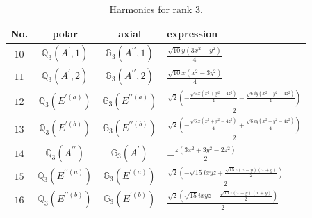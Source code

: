 \documentclass[fleqn,8pt,landscape]{jsarticle}
\begin{document}
\begin{table}[ht!]
\begin{center}
\caption{Harmonics for rank 3.}
\renewcommand{\arraystretch}{1.3}
\begin{tabular}{cccl} \hline \hline
No. & polar & axial & expression \\ \hline
$ 10 $ & $ \mathbb{Q}_{3}(A^{\prime},1) $ & $ \mathbb{G}_{3}(A^{\prime\prime},1) $ & $ \frac{\sqrt{10} y \left(3 x^{2} - y^{2}\right)}{4} $ \\
$ 11 $ & $ \mathbb{Q}_{3}(A^{\prime},2) $ & $ \mathbb{G}_{3}(A^{\prime\prime},2) $ & $ \frac{\sqrt{10} x \left(x^{2} - 3 y^{2}\right)}{4} $ \\
$ 12 $ & $ \mathbb{Q}_{3}(E^{\prime(a)}) $ & $ \mathbb{G}_{3}(E^{\prime\prime(a)}) $ & $ \frac{\sqrt{2} \left(- \frac{\sqrt{6} x \left(x^{2} + y^{2} - 4 z^{2}\right)}{4} - \frac{\sqrt{6} i y \left(x^{2} + y^{2} - 4 z^{2}\right)}{4}\right)}{2} $ \\
$ 13 $ & $ \mathbb{Q}_{3}(E^{\prime(b)}) $ & $ \mathbb{G}_{3}(E^{\prime\prime(b)}) $ & $ \frac{\sqrt{2} \left(- \frac{\sqrt{6} x \left(x^{2} + y^{2} - 4 z^{2}\right)}{4} + \frac{\sqrt{6} i y \left(x^{2} + y^{2} - 4 z^{2}\right)}{4}\right)}{2} $ \\
$ 14 $ & $ \mathbb{Q}_{3}(A^{\prime\prime}) $ & $ \mathbb{G}_{3}(A^{\prime}) $ & $ - \frac{z \left(3 x^{2} + 3 y^{2} - 2 z^{2}\right)}{2} $ \\
$ 15 $ & $ \mathbb{Q}_{3}(E^{\prime\prime(a)}) $ & $ \mathbb{G}_{3}(E^{\prime(a)}) $ & $ \frac{\sqrt{2} \left(- \sqrt{15} i x y z + \frac{\sqrt{15} z \left(x - y\right) \left(x + y\right)}{2}\right)}{2} $ \\
$ 16 $ & $ \mathbb{Q}_{3}(E^{\prime\prime(b)}) $ & $ \mathbb{G}_{3}(E^{\prime(b)}) $ & $ \frac{\sqrt{2} \left(\sqrt{15} i x y z + \frac{\sqrt{15} z \left(x - y\right) \left(x + y\right)}{2}\right)}{2} $ \\
 \hline \hline
\end{tabular}
\end{center}
\end{table}
\end{document}
